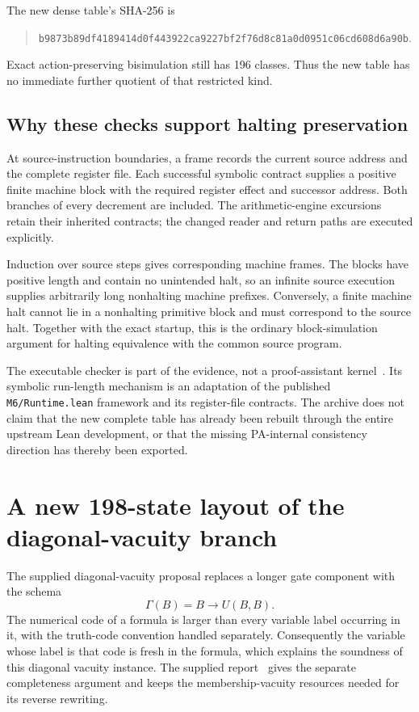 \documentclass[11pt,letterpaper]{article}
\newcommand{\code}[1]{\texttt{\nolinkurl{#1}}}
\begin{document}
\begin{samepage}
The new dense table's SHA-256 is
\begin{quote}\small\nolinkurl{b9873b89df4189414d0f443922ca9227bf2f76d8c81a0d0951c06cd608d6a90b}.\end{quote}
\end{samepage}
Exact action-preserving bisimulation still has 196 classes. Thus the
new table has no immediate further quotient of that restricted kind.

\subsection{Why these checks support halting preservation}

At source-instruction boundaries, a frame records the current source
address and the complete register file. Each successful symbolic
contract supplies a positive finite machine block with the required
register effect and successor address. Both branches of every decrement
are included. The arithmetic-engine excursions retain their inherited
contracts; the changed reader and return paths are executed explicitly.

Induction over source steps gives corresponding machine frames. The
blocks have positive length and contain no unintended halt, so an
infinite source execution supplies arbitrarily long nonhalting machine
prefixes. Conversely, a finite machine halt cannot lie in a nonhalting
primitive block and must correspond to the source halt. Together with
the exact startup, this is the ordinary block-simulation argument for
halting equivalence with the common source program.

The executable checker is part of the evidence, not a proof-assistant
kernel~\cite{runtime}. Its symbolic run-length mechanism is an adaptation of the
published \code{M6/Runtime.lean} framework and its register-file
contracts. The archive does not claim that the new complete table has
already been rebuilt through the entire upstream Lean development, or
that the missing PA-internal consistency direction has thereby been
exported.

\section{A new 198-state layout of the diagonal-vacuity branch}

The supplied diagonal-vacuity proposal replaces a longer gate component
with the schema
\[
 \Gamma(B)=B\to U(B,B).
\]
The numerical code of a formula is larger than every variable label
occurring in it, with the truth-code convention handled separately.
Consequently the variable whose label is that code is fresh in the
formula, which explains the soundness of this diagonal vacuity instance.
The supplied report~\cite{incoming} gives the separate completeness argument and keeps
the membership-vacuity resources needed for its reverse rewriting.
\end{document}
